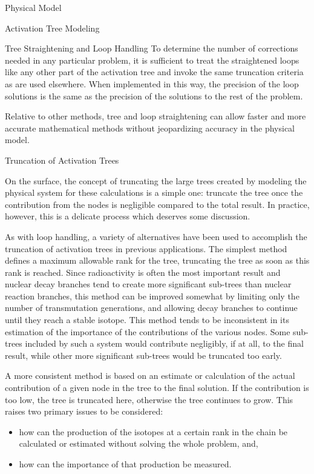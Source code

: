 \begin{chapter}{Physical Model\label{chap:physical}}
\begin{section}{Activation Tree Modeling\label{sec:physical.chains}}
\begin{subsection}{Tree Straightening and Loop Handling\label{sec:physical.chains.loops}}
    To determine the number of corrections needed in any particular
    problem, it is sufficient to treat the straightened loops like any
    other part of the activation tree and invoke the same truncation
    criteria as are used elsewhere.  When implemented in this way, the
    precision of the loop solutions is the same as the precision of
    the solutions to the rest of the problem.
    
    Relative to other methods, tree and loop straightening can allow
    faster and more accurate mathematical methods without jeopardizing
    accuracy in the physical model.

  \end{subsection}

  \begin{subsection}{Truncation of Activation Trees\label{sec:physical.chains.trunc}}
    
    On the surface, the concept of truncating the large trees created
    by modeling the physical system for these calculations is a simple
    one: truncate the tree once the contribution from the nodes is
    negligible compared to the total result.  In practice, however,
    this is a delicate process which deserves some discussion.
    
    As with loop handling, a variety of alternatives have been used to
    accomplish the truncation of activation trees in previous
    applications.  The simplest method defines a maximum allowable
    rank for the tree, truncating the tree as soon as this rank is
    reached.  Since radioactivity is often the most important result
    and nuclear decay branches tend to create more significant
    sub-trees than nuclear reaction branches, this method can be
    improved somewhat by limiting only the number of transmutation
    generations, and allowing decay branches to continue until they
    reach a stable isotope\cite{RACC}.  This method tends to be
    inconsistent in its estimation of the importance of the
    contributions of the various nodes.  Some sub-trees included by
    such a system would contribute negligibly, if at all, to the final
    result, while other more significant sub-trees would be truncated
    too early.
    
    A more consistent method is based on an estimate or calculation of
    the actual contribution of a given node in the tree to the final
    solution.  If the contribution is too low, the tree is truncated
    here, otherwise the tree continues to grow.  This raises two
    primary issues to be considered:
    \begin{itemize}
    \item how can the production of the isotopes at a certain rank in
      the chain be calculated or estimated without solving the whole
      problem, and,
    \item how can the importance of that production be measured.
    \end{itemize}
    

\end{subsection}
\end{section}
\end{chapter}
